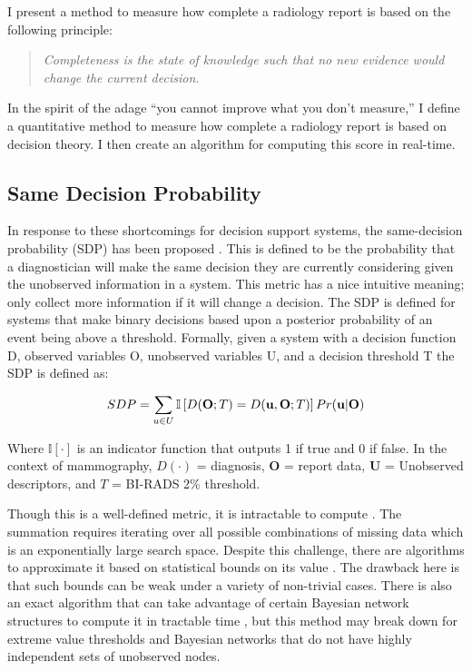 I present a method to measure how complete a radiology report is based on the following principle:

\begin{quote}
\begin{center}
		\emph{Completeness is the state of knowledge such that no new evidence would change the current decision.}
\end{center}
\end{quote}


In the spirit of the adage ``you cannot improve what you don't measure,'' I define a quantitative method to measure how complete a radiology report is based on decision theory. I then create an algorithm for computing this score in real-time.

\subsection{Same Decision Probability}
In response to these shortcomings for decision support systems, the same-decision probability (SDP) has been proposed \cite{Choi:2012id}. This is defined to be the probability that a diagnostician will make the same decision they are currently considering given the unobserved information in a system. This metric has a nice intuitive meaning; only collect more information if it will change a decision. The SDP is defined for systems that make binary decisions based upon a posterior probability of an event being above a threshold. Formally, given a system with a decision function D, observed variables O, unobserved variables U, and a decision threshold T the SDP is defined as:

\begin{equation}
\Large
SDP = \sum_{u \in U}\mathbb{I}\left[D(\mathbf{O};T) = D(\mathbf{u},\mathbf{O};T)\right]Pr(\mathbf{u}|\mathbf{O})
\end{equation}

Where $\mathbb{I}[\cdotp]$ is an indicator function that outputs 1 if true and 0 if false. 
In the context of mammography, $D(\cdotp)$ = diagnosis, $\mathbf{O}$ = report data, $\mathbf{U}$ = Unobserved descriptors, and $T$ = BI-RADS 2\% threshold.

Though this is a well-defined metric, it is intractable to compute \cite{Chen:2013tw}. The summation requires iterating over all possible combinations of missing data which is an exponentially large search space. Despite this challenge, there are algorithms to approximate it based on statistical bounds on its value \cite{Choi:2012id}. The drawback here is that such bounds can be weak under a variety of non-trivial cases. There is also an exact algorithm that can take advantage of certain Bayesian network structures to compute it in tractable time \cite{Chen:2013tw}, but this method may break down for extreme value thresholds and Bayesian networks that do not have highly independent sets of unobserved nodes.

